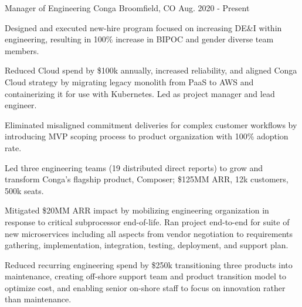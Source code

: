 

\begin{cventries}

  \cventry
    {Manager of Engineering} %
    {Conga} %
    {Broomfield, CO} %
    {Aug. 2020 - Present} %
    {
      \begin{cvitems} %
      \item {Designed and executed new-hire program focused on increasing DE\&I within engineering, resulting in 100\% increase in BIPOC and gender diverse team members.}
      \item {Reduced Cloud spend by \$100k annually, increased reliability, and aligned Conga Cloud strategy by migrating legacy monolith from PaaS to AWS and containerizing it for use with Kubernetes. Led as project manager and lead engineer.}
      \item {Eliminated misaligned commitment deliveries for complex customer workflows by introducing MVP scoping process to product organization with 100\% adoption rate.}
	\item {Led three engineering teams (19 distributed direct reports) to grow and transform Conga's flagship product, Composer; \$125MM ARR, 12k customers, 500k seats.}
	\item {Mitigated \$20MM ARR impact by mobilizing engineering organization in response to critical subprocessor end-of-life. Ran project end-to-end for suite of new microservices including all aspects from vendor negotiation to requirements gathering, implementation, integration, testing, deployment, and support plan.}
	\item {Reduced recurring engineering spend by \$250k transitioning three products into maintenance, creating off-shore support team and product transition model to optimize cost, and enabling senior on-shore staff to focus on innovation rather than maintenance.}
      \end{cvitems}
    }


\end{cventries}

